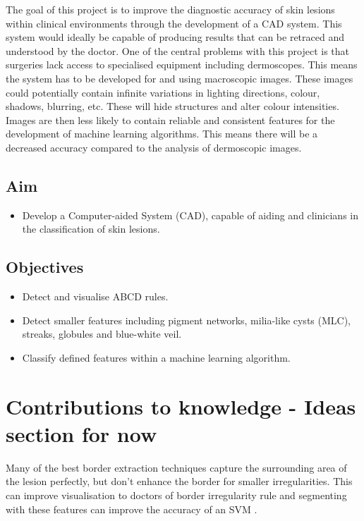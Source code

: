 \documentclass[12pt]{report}
\begin{document}
The goal of this project is to improve the diagnostic accuracy of skin lesions within clinical environments through the development of a CAD system. This system would ideally be capable of producing results that can be retraced and understood by the doctor. One of the central problems with this project is that surgeries lack access to specialised equipment including dermoscopes. This means the system has to be developed for and using macroscopic images. These images could potentially contain infinite variations in lighting directions, colour, shadows, blurring, etc. These will hide structures and alter colour intensities. Images are then less likely to contain reliable and consistent features for the development of machine learning algorithms. This means there will be a decreased accuracy compared to the analysis of dermoscopic images.

\subsection{Aim}
\begin{itemize}
	\item Develop a Computer-aided System (CAD), capable of aiding and clinicians in the classification of skin lesions.
\end{itemize}

\subsection{Objectives}
\begin{itemize}
	\item Detect and visualise ABCD rules.
	\item Detect smaller features including pigment networks, milia-like cysts (MLC), streaks, globules and blue-white veil.
	\item Classify defined features within a machine learning algorithm.
\end{itemize}

\section{Contributions to knowledge - Ideas section for now}
Many of the best border extraction techniques capture the surrounding area of the lesion perfectly, but don't enhance the border for smaller irregularities. This can improve visualisation to doctors of border irregularity rule and segmenting with these features can improve the accuracy of an SVM \cite{Pereira2020}.
\end{document}
